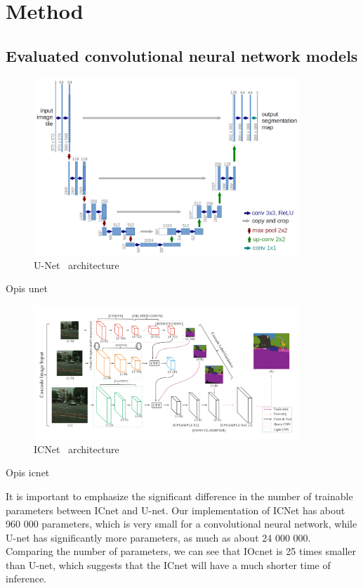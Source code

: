 \documentclass{article}
\begin{document}
\clearpage

\section{Method}
\label{sec:method}
\subsection{Evaluated convolutional neural network models}
\label{sec:evaluated_models}

\begin{figure}[!htb]
    \centering
  \includegraphics[width=10cm, keepaspectratio]{images/u-net-architecture.png}
  \caption{U-Net~\cite{unet} architecture}
  \label{fig:u-net-architecture}
\end{figure}

Opis unet

\begin{figure}[!htb]
    \centering
  \includegraphics[width=10cm, keepaspectratio]{images/i-cnet-architecture.png}
  \caption{ICNet~\cite{icnet} architecture}
  \label{fig:i-cnet-architecture}
\end{figure}

Opis icnet

It is important to emphasize the significant difference in the number of trainable parameters between ICnet and U-net. Our implementation of ICNet has about 960 000 parameters, which is very small for a convolutional neural network, while U-net has significantly more parameters, as much as about 24 000 000. Comparing the number of parameters, we can see that IOcnet is 25 times smaller than U-net, which suggests that the ICnet will have a much shorter time of inference.
\end{document}
